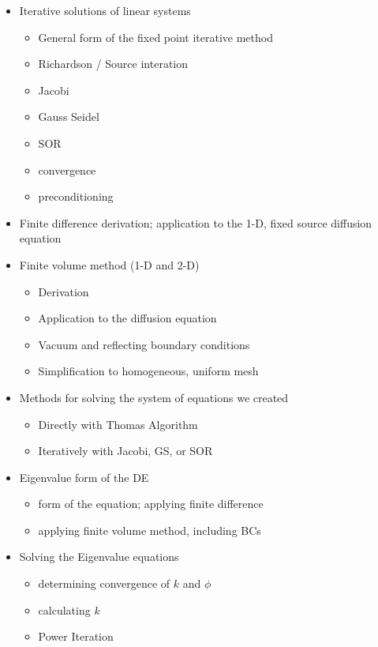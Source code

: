 \documentclass[12pt]{article}
\begin{document}
\begin{itemize}
\item Iterative solutions of linear systems
  \begin{itemize}
  \item General form of the fixed point iterative method
  \item Richardson / Source interation
  \item Jacobi
  \item Gauss Seidel
  \item SOR
  \item convergence
  \item preconditioning
  \end{itemize}


\item Finite difference derivation; application to the 1-D, fixed source diffusion equation
\item Finite volume method (1-D and 2-D)
  \begin{itemize}
  \item Derivation
  \item Application to the diffusion equation
  \item Vacuum and reflecting boundary conditions
  \item Simplification to homogeneous, uniform mesh
  \end{itemize}
  
\item Methods for solving the system of equations we created
  \begin{itemize}
  \item Directly with Thomas Algorithm
  \item Iteratively with Jacobi, GS, or SOR
  \end{itemize}

\item Eigenvalue form of the DE
  \begin{itemize}
  \item form of the equation; applying finite difference
  \item applying finite volume method, including BCs
  \end{itemize}
  
\item Solving the Eigenvalue equations
  \begin{itemize}
  \item determining convergence of $k$ and $\phi$
  \item calculating $k$
  \item Power Iteration
  \end{itemize}
\end{itemize}
\end{document}
